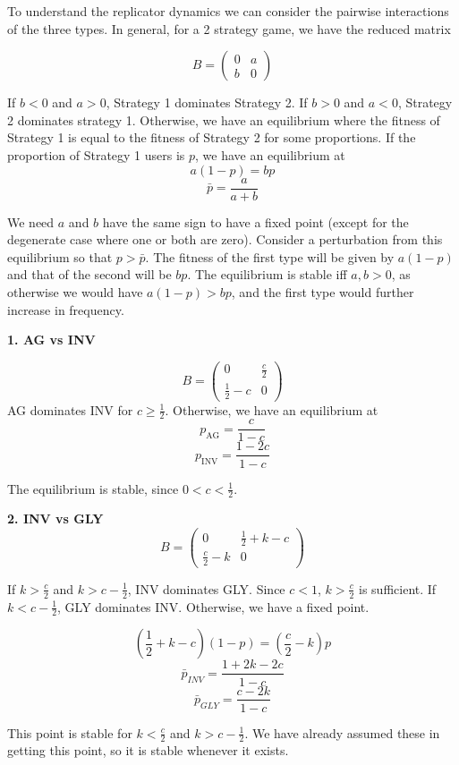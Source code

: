 \documentclass[12pt]{report}
\begin{document}
To understand the replicator dynamics we can consider the pairwise interactions of the three types. In general, for a 2 strategy game, we have the reduced matrix

$$B = \begin{pmatrix}
0 & a \\
b & 0 
\end{pmatrix} $$

If $b < 0$ and $a > 0$, Strategy 1 dominates Strategy 2. If $b > 0$ and $a < 0$, Strategy 2 dominates strategy 1. Otherwise, we have an equilibrium where the fitness of Strategy 1 is equal to the fitness of Strategy 2 for some proportions. If the proportion of Strategy 1 users is $p$, we have an equilibrium at 
$$ a (1 - p) = b p$$
$$\bar{p} = \frac{a}{a+b}$$

We need $a$ and $b$ have the same sign to have a fixed point (except for the degenerate case where one or both are zero). 
Consider a perturbation from this equilibrium so that $p > \bar{p}$. The fitness of the first type will be given by $a(1-p)$ and that of the second will be $bp$. The equilibrium is stable iff $a, b > 0$, as otherwise we would have $a(1-p) > bp$, and the first type would further increase in frequency.

\textbf{1. AG vs INV} 

$$B = \begin{pmatrix}
0 & \frac{c}{2}\\
\frac{1}{2} - c & 0 
\end{pmatrix} $$
AG dominates INV for $c \ge \frac{1}{2}$. Otherwise, we have an equilibrium at 
$$p_{\text{AG}} = \frac{c}{1-c}$$
$$p_{\text{INV}} = \frac{1 - 2c}{1-c}$$

The equilibrium is stable, since $0 < c < \frac{1}{2}$. 

\textbf{2. INV vs GLY}
$$B = \begin{pmatrix}
0 & \frac{1}{2} + k - c\\
\frac{c}{2} - k & 0 
\end{pmatrix} $$

If $k > \frac{c}{2}$ and $k > c - \frac{1}{2}$, INV dominates GLY. Since $c < 1$, $k > \frac{c}{2}$ is sufficient. If $k  < c - \frac{1}{2}$, GLY dominates INV. Otherwise, we have a fixed point.  

$$(\frac{1}{2} + k - c) (1 - p) = (\frac{c}{2} - k) p$$
$$\bar{p}_{INV} = \frac{1 + 2k - 2c}{1 - c}$$
$$\bar{p}_{GLY} = \frac{c - 2k}{1-c}$$

This point is stable for $k < \frac{c}{2}$ and $k > c - \frac{1}{2}$. We have already assumed these in getting this point, so it is stable whenever it exists.
 
\end{document}
